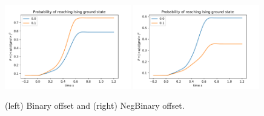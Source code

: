 \documentclass[]{article}
\begin{document}
\begin{figure}[htb]
	\centering
	\includegraphics[width=0.49\textwidth]{proba_binary.pdf}
	\includegraphics[width=0.49\textwidth]{proba_negbinary.pdf}
	\caption{\label{fig:proba_dwave} (left) Binary offset and (right) NegBinary offset.
	}
\end{figure}
\end{document}
